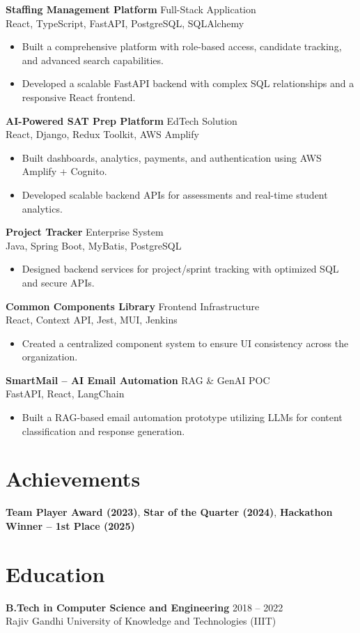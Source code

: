 \documentclass[11pt]{article}
\begin{document}
\textbf{Staffing Management Platform} \hfill Full-Stack Application \\
React, TypeScript, FastAPI, PostgreSQL, SQLAlchemy
\begin{itemize}
    \item Built a comprehensive platform with role-based access, candidate tracking, and advanced search capabilities.
    \item Developed a scalable FastAPI backend with complex SQL relationships and a responsive React frontend.
\end{itemize}

\textbf{AI-Powered SAT Prep Platform} \hfill EdTech Solution \\
React, Django, Redux Toolkit, AWS Amplify
\begin{itemize}
    \item Built dashboards, analytics, payments, and authentication using AWS Amplify + Cognito.
    \item Developed scalable backend APIs for assessments and real-time student analytics.
\end{itemize}

\textbf{Project Tracker} \hfill Enterprise System \\
Java, Spring Boot, MyBatis, PostgreSQL
\begin{itemize}
    \item Designed backend services for project/sprint tracking with optimized SQL and secure APIs.
\end{itemize}

\textbf{Common Components Library} \hfill Frontend Infrastructure \\
React, Context API, Jest, MUI, Jenkins
\begin{itemize}
    \item Created a centralized component system to ensure UI consistency across the organization.
\end{itemize}

\textbf{SmartMail – AI Email Automation} \hfill RAG & GenAI POC \\
FastAPI, React, LangChain
\begin{itemize}
    \item Built a RAG-based email automation prototype utilizing LLMs for content classification and response generation.
\end{itemize}

\section*{Achievements}
\textbf{Team Player Award (2023)}, \textbf{Star of the Quarter (2024)}, \textbf{Hackathon Winner – 1st Place (2025)}

\section*{Education}
\textbf{B.Tech in Computer Science and Engineering} \hfill 2018 -- 2022 \\
Rajiv Gandhi University of Knowledge and Technologies (IIIT)
\end{document}
